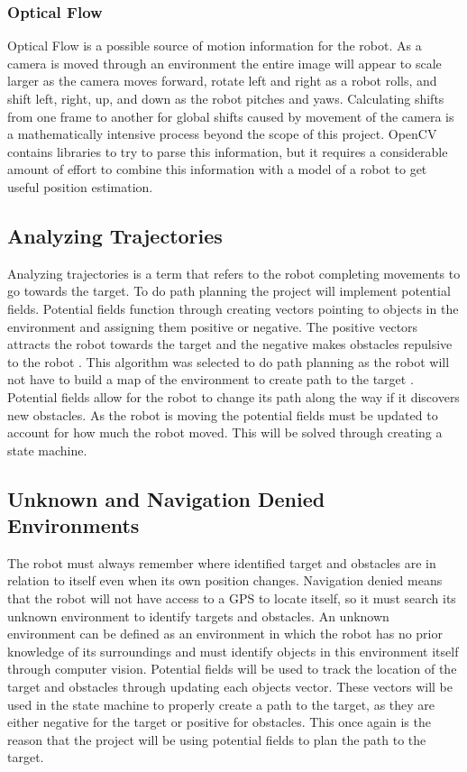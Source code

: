 \documentclass{article}
\begin{document}
		\subsubsection{Optical Flow}
		
		Optical Flow is a possible source of motion information for the robot. As a camera is moved through an environment the entire image will appear to scale larger as the camera moves forward, rotate left and right as a robot rolls, and shift left, right, up, and down as the robot pitches and yaws. Calculating shifts from one frame to another for global shifts caused by movement of the camera is a mathematically intensive process beyond the scope of this project. OpenCV contains libraries to try to parse this information, but it requires a considerable amount of effort to combine this information with a model of a robot to get useful position estimation.
	
	\subsection{Analyzing Trajectories}
	
	Analyzing trajectories is a term that refers to the robot completing movements to go towards the target. To do path planning the project will implement potential fields. Potential fields function through creating vectors pointing to objects in the environment and assigning them positive or negative. The positive vectors attracts the robot towards the target and the negative makes obstacles repulsive to the robot \cite{hwang1992potential}. This algorithm was selected to do path planning as the robot will not have to build a map of the environment to create path to the target \cite{bortoff2000path}. Potential fields allow for the robot to change its path along the way if it discovers new obstacles. As the robot is moving the potential fields must be updated to account for how much the robot moved. This will be solved through creating a state machine. 

	\subsection{Unknown and Navigation Denied Environments}

	The robot must always remember where identified target and obstacles are in relation to itself even when its own position changes. Navigation denied means that the robot will not have access to a GPS to locate itself, so it must search its unknown environment to identify targets and obstacles. An unknown environment can be defined as an environment in which the robot has no prior knowledge of its surroundings and must identify objects in this environment itself through computer vision. Potential fields will be used to track the location of the target and obstacles through updating each objects vector. These vectors will be used in the state machine to properly create a path to the target, as they are either negative for the target or positive for obstacles. This once again is the reason that the project will be using potential fields to plan the path to the target. 
\end{document}
